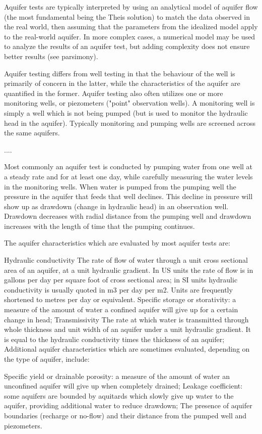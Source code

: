 Aquifer tests are typically interpreted by using an analytical model of aquifer flow (the most fundamental being the Theis solution) to match the data observed in the real world, then assuming that the parameters from the idealized model apply to the real-world aquifer. In more complex cases, a numerical model may be used to analyze the results of an aquifer test, but adding complexity does not ensure better results (see parsimony).

Aquifer testing differs from well testing in that the behaviour of the well is primarily of concern in the latter, while the characteristics of the aquifer are quantified in the former. Aquifer testing also often utilizes one or more monitoring wells, or piezometers ("point" observation wells). A monitoring well is simply a well which is not being pumped (but is used to monitor the hydraulic head in the aquifer). Typically monitoring and pumping wells are screened across the same aquifers.

....

Most commonly an aquifer test is conducted by pumping water from one well at a steady rate and for at least one day, while carefully measuring the water levels in the monitoring wells. When water is pumped from the pumping well the pressure in the aquifer that feeds that well declines. This decline in pressure will show up as drawdown (change in hydraulic head) in an observation well. Drawdown decreases with radial distance from the pumping well and drawdown increases with the length of time that the pumping continues.

The aquifer characteristics which are evaluated by most aquifer tests are:

Hydraulic conductivity The rate of flow of water through a unit cross sectional area of an aquifer, at a unit hydraulic gradient. In US units the rate of flow is in gallons per day per square foot of cross sectional area; in SI units hydraulic conductivity is usually quoted in m3 per day per m2. Units are frequently shortened to metres per day or equivalent.
Specific storage or storativity: a measure of the amount of water a confined aquifer will give up for a certain change in head;
Transmissivity The rate at which water is transmitted through whole thickness and unit width of an aquifer under a unit hydraulic gradient. It is equal to the hydraulic conductivity times the thickness of an aquifer;
Additional aquifer characteristics which are sometimes evaluated, depending on the type of aquifer, include:

Specific yield or drainable porosity: a measure of the amount of water an unconfined aquifer will give up when completely drained;
Leakage coefficient: some aquifers are bounded by aquitards which slowly give up water to the aquifer, providing additional water to reduce drawdown;
The presence of aquifer boundaries (recharge or no-flow) and their distance from the pumped well and piezometers.

